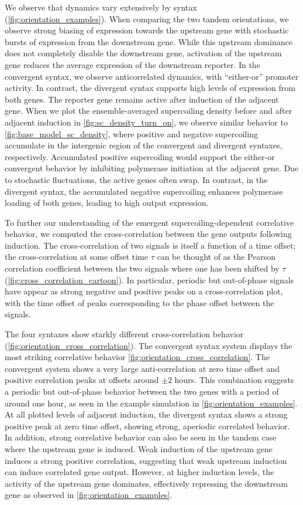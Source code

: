 \documentclass[11pt]{article}
\begin{document}
We observe that dynamics vary extensively by syntax (\cref{fig:orientation_examples}). When comparing the two tandem orientations, we observe strong biasing of expression towards the upstream gene with stochastic bursts of expression from the downstream gene. While this upstream dominance does not completely disable the downstream gene, activation of the upstream gene reduces the average expression of the downstream reporter. In the convergent syntax, we observe anticorrelated dynamics, with ``either-or'' promoter activity. In contrast, the divergent syntax supports high levels of expression from both genes. The reporter gene remains active after induction of the adjacent gene. When we plot the ensemble-averaged supercoiling density before and after adjacent induction in \cref{fig:sc_density_turn_on}, we observe similar behavior to \cref{fig:base_model_sc_density}, where positive and negative supercoiling accumulate in the intergenic region of the convergent and divergent syntaxes, respectively. Accumulated positive supercoiling would support the either-or convergent behavior by inhibiting polymerase initiation at the adjacent gene. Due to stochastic fluctuations, the active genes often swap. In contrast, in the divergent syntax, the accumulated negative supercoiling enhances polymerase loading of both genes, leading to high output expression.

To further our understanding of the emergent supercoiling-dependent correlative behavior, we computed the cross-correlation between the gene outputs following induction. The cross-correlation of two signals is itself a function of a time offset; the cross-correlation at some offset time \(\tau\) can be thought of as the Pearson correlation coefficient between the two signals where one has been shifted by \(\tau\) (\cref{fig:cross_correlation_cartoon}). In particular, periodic but out-of-phase signals have appear as strong negative and positive peaks on a cross-correlation plot, with the time offset of peaks corresponding to the phase offset between the signals.

The four syntaxes show starkly different cross-correlation behavior (\cref{fig:orientation_cross_correlation}). The convergent syntax system displays the most striking correlative behavior \cref{fig:orientation_cross_correlation}. The convergent system shows a very large anti-correlation at zero time offset and positive correlation peaks at offsets around \(\pm 2\) hours. This combination suggests a periodic but out-of-phase behavior between the two genes with a period of around one hour, as seen in the example simulation in \cref{fig:orientation_examples}. At all plotted levels of adjacent induction, the divergent syntax shows a strong positive peak at zero time offset, showing strong, aperiodic correlated behavior.
In addition, strong correlative behavior can also be seen in the tandem case where the upstream gene is induced. Weak induction of the upstream gene induces a strong positive correlation, suggesting that weak upstream induction can induce correlated gene output. However, at higher induction levels, the activity of the upstream gene dominates, effectively repressing the downstream gene as observed in \cref{fig:orientation_examples}.
\end{document}
